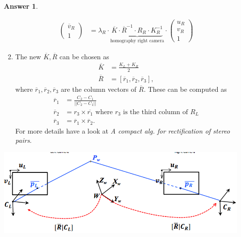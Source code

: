 \documentclass[a4paper,12 pt]{article}
\theoremstyle{definition}
\theoremstyle{remark}
\theoremstyle{definition}
\theoremstyle{definition}
\theoremstyle{definition}
\theoremstyle{definition}
\theoremstyle{remark}
\theoremstyle{remark}
\theoremstyle{definition}
\theoremstyle{definition}
\newtheorem*{answer}{Answer}
\begin{document}
\begin{enumerate}
\begin{answer}
\begin{enumerate}
\begin{equation}
\begin{split}
\begin{pmatrix}
 \overline{v}_R\\
 1
 \end{pmatrix}&=\lambda_R \cdot \underbrace{\overline{K}\cdot \overline{R}^{-1} \cdot R_R \cdot K_R^{-1}}_{\text{homography right camera}} \cdot \begin{pmatrix}
 u_R\\
 v_R\\
 1
 \end{pmatrix}
\end{split}
\end{equation}
\item The new $\overline{K},\overline{R}$ can be chosen as
\begin{equation}
\begin{split}
\overline{K}&=\frac{K_L+K_R}{2}\\
\overline{R}&=[\overline{r}_1,\overline{r}_2,\overline{r}_3],
\end{split}
\end{equation}
where $\overline{r}_1,\overline{r}_2,\overline{r}_3$ are the column vectors of $\overline{R}$. These can be computed as
\begin{equation}
\begin{split}
\overline{r}_1&=\frac{C_2-C_1}{||C_2-C_1||}\\
\overline{r}_2&=r_3 \times \overline{r_1} \text{ where } r_3 \text{ is the third column of }R_L\\
\overline{r}_3&=\overline{r}_1\times \overline{r}_2.
\end{split}
\end{equation}
For more details have a look at \textit{A compact alg. for rectification of stereo pairs}.
\end{enumerate}
\begin{minipage}{0.6 \columnwidth}
\includegraphics[width=\textwidth]{pics/rectif2}\label{fig:rectif2}
\end{minipage}
\hfill
\begin{minipage}{0.3 \columnwidth}

\end{minipage}
\end{answer}
\end{enumerate}
\end{document}

